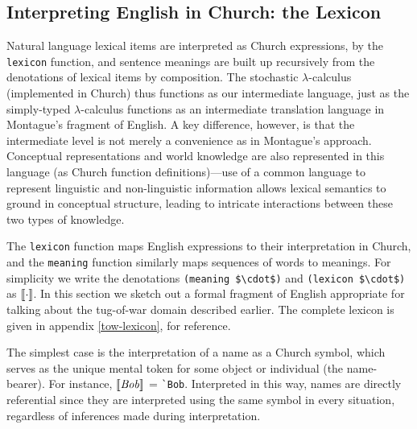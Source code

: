 \documentclass[pdfextras]{handbook}
\newcommand{\llbracket}{\ensuremath{\left [\!\left [}}%
\newcommand{\rrbracket}{\ensuremath{\right ]\!\right ]}}
\newcommand{\denot}[1]{\ensuremath{\llbracket \mathit{#1} \rrbracket}}
\begin{document}
\subsection{Interpreting English in Church: the Lexicon}
\label{lexicon}
Natural language lexical items are interpreted as Church expressions, by the \lstinline{lexicon} function, and sentence meanings are built up recursively from the denotations of lexical items by composition. 
%
The stochastic $\lambda$-calculus (implemented in Church) thus functions as our intermediate language, just as the simply-typed $\lambda$-calculus functions as an intermediate translation language in Montague's \citeyear{montague73} fragment of English. 
A key difference, however, is that the intermediate level is not merely a convenience as in Montague's approach. 
Conceptual representations and world knowledge are also represented in this language (as Church function definitions)---use of a common language to represent linguistic and non-linguistic information allows lexical semantics to ground in conceptual structure, leading to intricate interactions between these two types of knowledge. 

The \lstinline{lexicon} function maps English expressions to their interpretation in Church, and the \lstinline{meaning} function similarly maps sequences of words to meanings.
For simplicity we write the denotations \lstinline[mathescape]{(meaning $\cdot$)} and \lstinline[mathescape]{(lexicon $\cdot$)} as \denot{\cdot}. In this section we sketch out a formal fragment of English appropriate for talking about the tug-of-war domain described earlier. The complete lexicon is given in appendix \ref{tow-lexicon}, for reference.

The simplest case is the interpretation of a name as a Church symbol, which serves as the unique mental token for some object or individual (the name-bearer). For instance, \denot{Bob} = \lstinline{`Bob}.
Interpreted in this way, names are directly referential since they are interpreted using the same symbol in every situation, regardless of inferences made during interpretation. 
\end{document}
